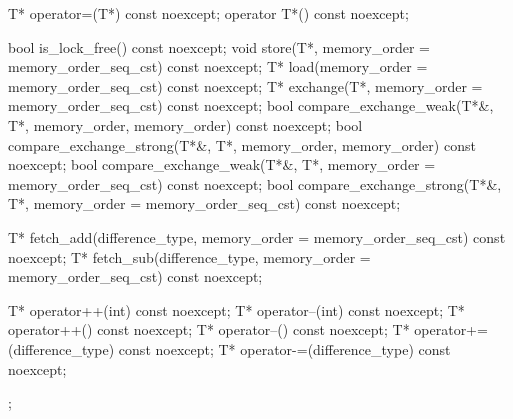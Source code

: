 \begin{codeblock}
{{    T* operator=(T*) const noexcept;
    operator T*() const noexcept;

    bool is_lock_free() const noexcept;
    void store(T*, memory_order = memory_order_seq_cst) const noexcept;
    T* load(memory_order = memory_order_seq_cst) const noexcept;
    T* exchange(T*, memory_order = memory_order_seq_cst) const noexcept;
    bool compare_exchange_weak(T*&, T*,
                               memory_order, memory_order) const noexcept;
    bool compare_exchange_strong(T*&, T*,
                                 memory_order, memory_order) const noexcept;
    bool compare_exchange_weak(T*&, T*,
                               memory_order = memory_order_seq_cst) const noexcept;
    bool compare_exchange_strong(T*&, T*,
                                 memory_order = memory_order_seq_cst) const noexcept;

    T* fetch_add(difference_type, memory_order = memory_order_seq_cst) const noexcept;
    T* fetch_sub(difference_type, memory_order = memory_order_seq_cst) const noexcept;

    T* operator++(int) const noexcept;
    T* operator--(int) const noexcept;
    T* operator++() const noexcept;
    T* operator--() const noexcept;
    T* operator+=(difference_type) const noexcept;
    T* operator-=(difference_type) const noexcept;
  };
}
\end{codeblock}

